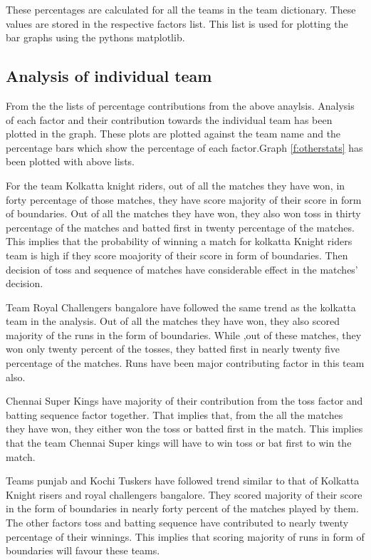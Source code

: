 \documentclass[sigconf]{acmart}
\begin{document}
 These percentages are calculated for all the teams in the team dictionary. These values are stored in the respective factors list. This list is used for plotting the bar graphs using the pythons matplotlib.

\subsection{Analysis of individual team}
From the the lists of percentage contributions from the above anaylsis. Analysis of each factor and their contribution towards the individual team has been plotted in the graph. These plots are plotted against the team name and the percentage bars which show the percentage of each factor.Graph \ref{f:otherstats} has been plotted with above lists. 

For the team Kolkatta knight riders, out of all the matches they have won, in forty percentage of those matches, they have score majority of their score in form of boundaries. Out of all the matches they have won, they also won toss in thirty percentage of the matches and batted first in twenty percentage of the matches. This implies that the probability of winning a match for kolkatta Knight riders team is high if they score moajority of their score in form of boundaries. Then decision of toss and sequence of matches have considerable effect in the matches’ decision.

Team Royal Challengers bangalore have followed the same trend as the kolkatta team in the analysis. Out of all the matches they have won, they also scored majority of the runs in the form of boundaries. While ,out of these matches, they won only twenty percent of the tosses, they batted first in nearly twenty five percentage of the matches. Runs have been major contributing factor in this team also.

Chennai Super Kings have majority of their contribution from the toss factor and batting sequence factor together. That implies that, from the all the matches they have won, they either won the toss or batted first in the match. This implies that the team Chennai Super kings will have to win toss or bat first to win the match.


Teams punjab and Kochi Tuskers have followed trend similar to that of Kolkatta Knight risers and royal challengers bangalore. They scored majority of their score in the form of boundaries in nearly forty percent of the matches played by them. The other factors toss and batting sequence have contributed to nearly twenty percentage of their winnings. This implies that scoring majority of runs in form of boundaries will favour these teams. 
\end{document}
